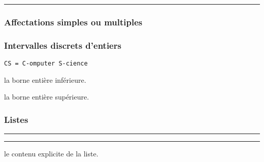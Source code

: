\documentclass[12pt,a4paper]{article}
\theoremstyle{definition}
\newcommand\separation{
    \medskip
    \hfill\rule{0.5\textwidth}{0.75pt}\hfill
    \medskip
}
\newcommand\extraspace{
    \vspace{0.25em}
}
\newcommand\prefix[1]{%
    \texttt{#1}%
}
\begin{document}
\separation




\extraspace



\extraspace




\subsubsection{Affectations simples ou multiples}






\extraspace


\extraspace




\subsubsection{Intervalles discrets d'entiers}



   \hfill \prefix{CS = C-omputer S-cience}

 la borne entière inférieure.

 la borne entière supérieure.





\subsubsection{Listes}







\separation






\separation



\IDarg{} le contenu explicite de la liste.
\end{document}
